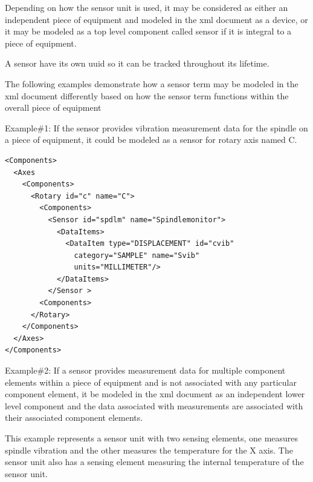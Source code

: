 Depending on how the \gls{sensor unit} is used, it may be considered as either an independent piece of equipment and modeled in the \gls{xml} document as a \gls{device}, or it may be modeled as a \gls{top level} \gls{component} called \gls{sensor} if it is integral to a piece of equipment.

A \gls{sensor} \may have its own \gls{uuid} so it can be tracked throughout its lifetime.

The following examples demonstrate how a \gls{sensor term} may be modeled in the \gls{xml} document differently based on how the \gls{sensor term} functions within the overall piece of equipment

Example\#1:   If the \gls{sensor} provides vibration measurement data for the spindle on a piece of equipment, it could be modeled as a \gls{sensor} for rotary axis named C.

\begin{lstlisting}[firstnumber=1,escapechar=|,%
    caption={Example of Sensor for rotary axis}, label={lst:example-of-sensor}]
<Components>
  <Axes
    <Components>
      <Rotary id="c" name="C">
        <Components>
          <Sensor id="spdlm" name="Spindlemonitor">
            <DataItems>
              <DataItem type="DISPLACEMENT" id="cvib"
                category="SAMPLE" name="Svib" 
                units="MILLIMETER"/>
            </DataItems>
          </Sensor >
        <Components>
      </Rotary>
    </Components>
  </Axes>
</Components>
\end{lstlisting}

Example\#2:   If a \gls{sensor} provides measurement data for multiple \gls{component} elements within a piece of equipment and is not associated with any particular \gls{component} element, it \may be modeled in the \gls{xml} document as an independent \gls{lower level} \gls{component} and the data associated with measurements are associated with their associated \gls{component} elements.

This example represents a \gls{sensor unit} with two \glspl{sensing element}, one measures spindle vibration and the other measures the temperature for the X axis.   The \gls{sensor unit} also has a \gls{sensing element} measuring the internal temperature of the \gls{sensor unit}.


